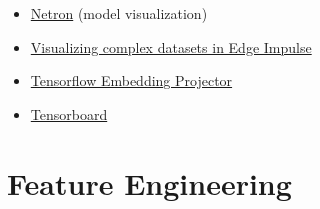 \begin{itemize}
  \item \href{https://netron.app/}{Netron} (model visualization)
  \item \href{https://www.edgeimpulse.com/blog/visualizing-complex-datasets-in-edge-impulse}{Visualizing complex datasets in Edge Impulse}
  \item \href{https://projector.tensorflow.org/}{Tensorflow Embedding Projector}
  \item \href{https://www.tensorflow.org/tensorboard}{Tensorboard}
\end{itemize}
  
\section{Feature Engineering}

